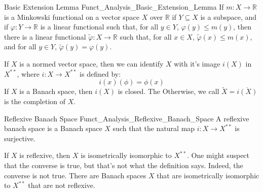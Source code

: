 \documentclass[crop=false,class=book,oneside]{standalone}                      %
\begin{document}
        \begin{ltheorem}{Basic Extension Lemma}
              {Funct_Analysis_Basic_Extension_Lemma}
            If $m:X\rightarrow\mathbb{R}$ is a Minkowski functional
            on a vector space $X$ over $\mathbb{R}$ if
            $Y\subseteq{X}$ is a subspace, and if
            $\varphi:Y\rightarrow\mathbb{R}$ is a linear functional
            such that, for all $y\in{Y}$,
            $\varphi(y)\leq{m}(y)$, then there is a linear
            functional $\tilde{\varphi}:X\rightarrow\mathbb{R}$
            such that, for all $x\in{X}$,
            $\tilde{\varphi}(x)\leq{m}(x)$, and for all $y\in{Y}$,
            $\tilde{\varphi}(y)=\varphi(y)$.
        \end{ltheorem}
        If $X$ is a normed vector space, then we can identify
        $X$ with it's image $i(X)$ in $X^{**}$, where
        $i:X\rightarrow{X}^{**}$ is defined by:
        \begin{equation}
            i(x)(\phi)=\phi(x)
        \end{equation}
        If $X$ is a Banach space, then $i(X)$ is closed. The
        Otherwise, we call $\tilde{X}=\overline{i(X)}$ is the
        completion of $X$.
        \begin{ldefinition}{Reflexive Banach Space}
              {Funct_Analysis_Reflexive_Banach_Space}
            A reflexive banach space is a Banach space $X$ such
            that the natural map $i:X\rightarrow{X}^{**}$ is
            surjective.
        \end{ldefinition}
        If $X$ is reflexive, then $X$ is isometrically isomorphic
        to $X^{**}$. One might suspect that the converse is true,
        but that's not what the definition says. Indeed, the
        converse is not true. There are Banach spaces $X$ that
        are isometrically isomorphic to $X^{**}$ that are not
        reflexive.
\end{document}
